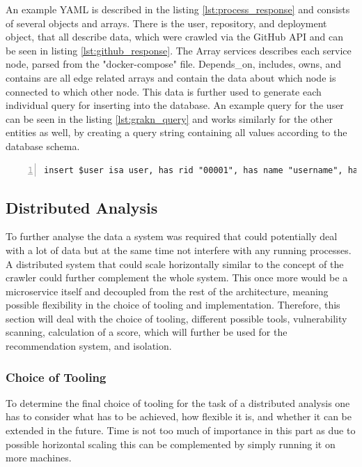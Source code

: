 An example YAML is described in the listing \ref{lst:process_response} and consists of several objects and arrays. There is the user, repository, and deployment object, that all describe data, which were crawled via the GitHub API and can be seen in listing \ref{lst:github_response}.
The Array services describes each service node, parsed from the "docker-compose" file. Depends\_on, includes, owns, and contains are all edge related arrays and contain the data about which node is connected to which other node.
This data is further used to generate each individual query for inserting into the database. An example query for the user can be seen in the listing \ref{lst:grakn_query} and works similarly for the other entities as well, by creating a query string containing all values according to the database schema.

\begin{lstlisting}[caption=Grakn query, breaklines=true, label=lst:grakn_query, numbers=left,  basicstyle=\footnotesize\singlespacing]
insert $user isa user, has rid "00001", has name "username", has platform "github", has schemaVersion 1, has updated Date, has created Date;
\end{lstlisting}

\subsection{Distributed Analysis}
\label{sec:distributed_analysis}
To further analyse the data a system was required that could potentially deal with a lot of data but at the same time not interfere with any running processes. A distributed system that could scale horizontally similar to the concept of the crawler could further complement the whole system. This once more would be a microservice itself and decoupled from the rest of the architecture, meaning possible flexibility in the choice of tooling and implementation. Therefore, this section will deal with the choice of tooling, different possible tools, vulnerability scanning, calculation of a score, which will further be used for the recommendation system, and isolation.

\subsubsection{Choice of Tooling}
\label{sec:choice_of_tooling}
To determine the final choice of tooling for the task of a distributed analysis one has to consider what has to be achieved, how flexible it is, and whether it can be extended in the future. Time is not too much of importance in this part as due to possible horizontal scaling this can be complemented by simply running it on more machines.

